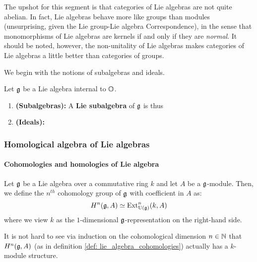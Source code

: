                     The upshot for this segment is that categories of Lie algebras are not quite abelian. In fact, Lie algebras behave more like groups than modules (unsurprising, given the Lie group-Lie algebra Correspondence), in the sense that monomorphisms of Lie algebras are kernels if and only if they are \textit{normal}. It should be noted, however, the non-unitality of Lie algebras makes categories of Lie algebras a little better than categories of groups. 
                    
                    We begin with the notions of subalgebras and ideals.
                    \begin{definition} \label{def: lie_subalgebras_and_lie_ideals}
                        Let $\mathfrak{g}$ be a Lie algebra internal to $\mathbb{O}$. 
                            \begin{enumerate}
                                \item \textbf{(Subalgebras):} A \textbf{Lie subalgebra} of $\mathfrak{g}$ is thus 
                                \item \textbf{(Ideals):}
                            \end{enumerate}
                    \end{definition}
                    
            \subsubsection{Homological algebra of Lie algebras}
                \paragraph{Cohomologies and homologies of Lie algebra}
                    \begin{definition} \label{def: lie_algebra_cohomologies}
                        Let $\mathfrak{g}$ be a Lie algebra over a commutative ring $k$ and let $A$ be a $\mathfrak{g}$-module. Then, we define the $n^{th}$ cohomology group of $\mathfrak{g}$ with coefficient in $A$ as:
                            $$H^n(\mathfrak{g}, A) \simeq \mathrm{Ext}^n_{\mathrm{U}(\mathfrak{g})}(k, A)$$
                        where we view $k$ as the $1$-dimensional $\mathfrak{g}$-representation on the right-hand side. 
                    \end{definition}
                    \begin{remark}
                        It is not hard to see via induction on the cohomological dimension $n \in \mathbb{N}$ that $H^n(\mathfrak{g}, A)$ (as in definition \ref{def: lie_algebra_cohomologies}) actually has a $k$-module structure.
                    \end{remark}
                    
